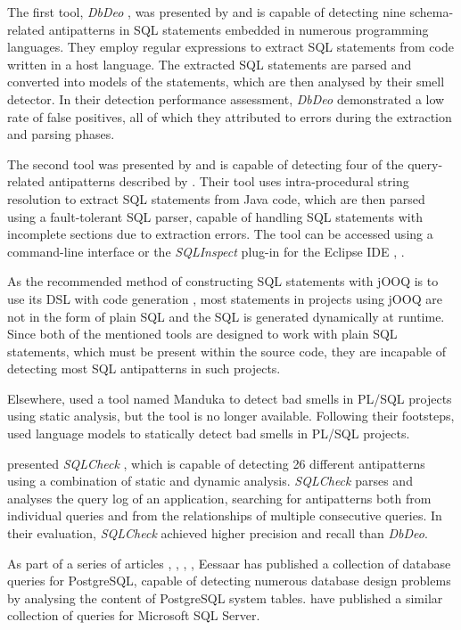 The first tool, \emph{DbDeo} , was presented by  and is capable of detecting nine schema-related antipatterns in SQL statements embedded in numerous programming languages. They employ regular expressions to extract SQL statements from code written in a host language. The extracted SQL statements are parsed and converted into models of the statements, which are then analysed by their smell detector. In their detection performance assessment, \emph{DbDeo} demonstrated a low rate of false positives, all of which they attributed to errors during the extraction and parsing phases.

The second tool was presented by  and is capable of detecting four of the query-related antipatterns described by . Their tool uses intra-procedural string resolution to extract SQL statements from Java code, which are then parsed using a fault-tolerant SQL parser, capable of handling SQL statements with incomplete sections due to extraction errors. The tool can be accessed using a command-line interface or the \emph{SQLInspect} plug-in for the Eclipse IDE , .

As the recommended method of constructing SQL statements with jOOQ is to use its DSL with code generation , most statements in projects using jOOQ are not in the form of plain SQL and the SQL is generated dynamically at runtime. Since both of the mentioned tools are designed to work with plain SQL statements, which must be present within the source code, they are incapable of detecting most SQL antipatterns in such projects.

Elsewhere,  used a tool named Manduka to detect bad smells in PL/SQL projects using static analysis, but the tool is no longer available. Following their footsteps,  used language models to statically detect bad smells in PL/SQL projects.

 presented \emph{SQLCheck} , which is capable of detecting 26 different antipatterns using a combination of static and dynamic analysis. \emph{SQLCheck} parses and analyses the query log of an application, searching for antipatterns both from individual queries and from the relationships of multiple consecutive queries. In their evaluation, \emph{SQLCheck} achieved higher precision and recall than \emph{DbDeo}.

As part of a series of articles , , , , Eessaar has published a collection of database queries for PostgreSQL, capable of detecting numerous database design problems by analysing the content of PostgreSQL system tables.  have published a similar collection of queries for Microsoft SQL Server.
